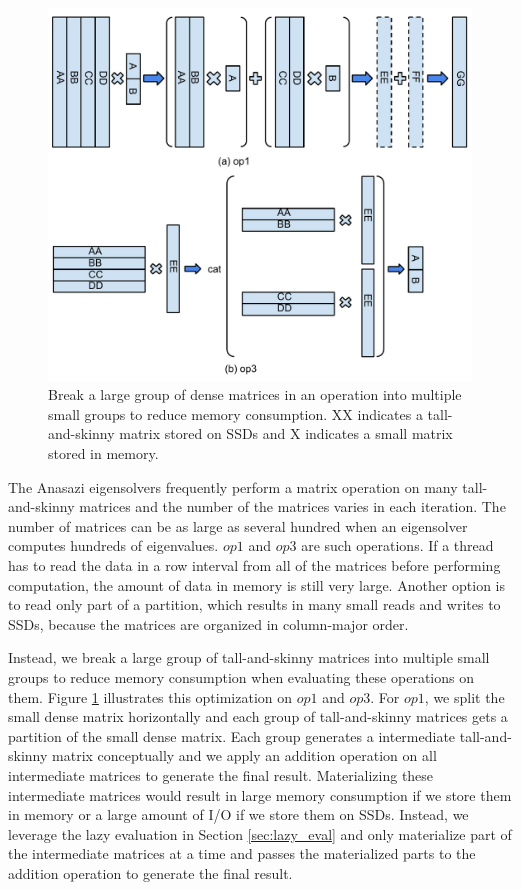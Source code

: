 \begin{figure}
\centering
\includegraphics[scale=0.4]{./mat_group.pdf}
\vspace{-5pt}
\caption{Break a large group of dense matrices in an operation into multiple
small groups to reduce memory consumption. XX indicates a tall-and-skinny matrix
stored on SSDs and X indicates a small matrix stored in memory.}
\vspace{-5pt}
\label{fig:mat_group}
\end{figure}

The Anasazi eigensolvers frequently perform a matrix operation on many
tall-and-skinny matrices and the number of the matrices varies in each iteration.
The number of matrices can be as large as several hundred when an eigensolver
computes hundreds of eigenvalues. $op1$ and $op3$ are such operations.
If a thread has to read the data in a row interval from all of the matrices
before performing computation,
the amount of data in memory is still very large. Another option is to read
only part of a partition, which results in many small reads and writes to SSDs,
because the matrices are organized in column-major order.

Instead, we break a large group of tall-and-skinny matrices into multiple small
groups to reduce
memory consumption when evaluating these operations on them. Figure
\ref{fig:mat_group} illustrates this optimization on $op1$ and $op3$. For $op1$,
we split the small dense matrix horizontally and each group of tall-and-skinny
matrices gets a partition of the small dense matrix. Each group generates
a intermediate tall-and-skinny matrix conceptually and we apply an addition
operation on all intermediate matrices to generate the final result.
Materializing these
intermediate matrices would result in large memory consumption if we store them
in memory or a large amount of I/O if we store them on SSDs. Instead, we leverage
the lazy evaluation in Section \ref{sec:lazy_eval} and only materialize part of
the intermediate matrices at a time and passes the materialized parts to
the addition operation to generate the final result.

